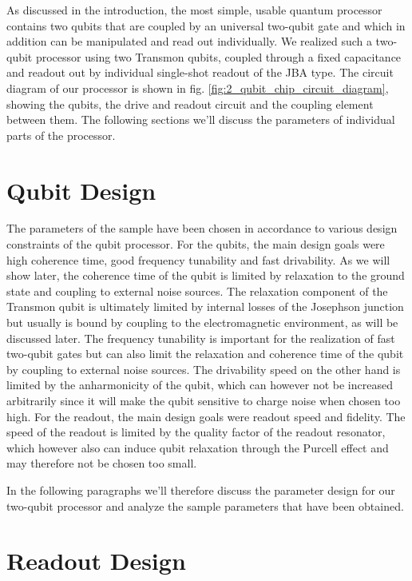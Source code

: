 As discussed in the introduction, the most simple, usable quantum processor contains two qubits that are coupled by an universal two-qubit gate and which in addition can be manipulated and read out individually. We realized such a two-qubit processor using two Transmon qubits, coupled through a fixed capacitance and readout out by individual single-shot readout of the JBA type. The circuit diagram of our processor is shown in fig. \ref{fig:2_qubit_chip_circuit_diagram}, showing the qubits, the drive and readout circuit and the coupling element between them. The following sections we'll discuss the parameters of individual parts of the processor.

\section{Qubit Design}

The parameters of the sample have been chosen in accordance to various design constraints of the qubit processor. For the qubits, the main design goals were high coherence time, good frequency tunability and fast drivability. As we will show later, the coherence time of the qubit is limited by relaxation to the ground state and coupling to external noise sources. The relaxation component of the Transmon qubit is ultimately limited by internal losses of the Josephson junction but usually is bound by coupling to the electromagnetic environment, as will be discussed later. The frequency tunability is important for the realization of fast two-qubit gates but can also limit the relaxation and coherence time of the qubit by coupling to external noise sources. The drivability speed on the other hand is limited by the anharmonicity of the qubit, which can however not be increased arbitrarily since it will make the qubit sensitive to charge noise when chosen too high. For the readout, the main design goals were readout speed and fidelity. The speed of the readout is limited by the quality factor of the readout resonator, which however also can induce qubit relaxation through the Purcell effect and may therefore not be chosen too small.

In the following paragraphs we'll therefore discuss the parameter design for our two-qubit processor and analyze the sample parameters that have been obtained.

\section{Readout Design}

